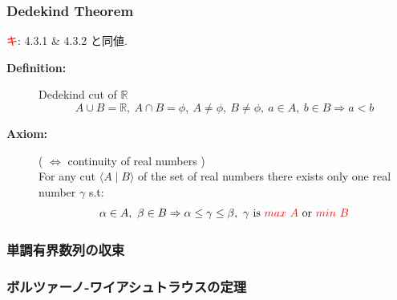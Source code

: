\documentclass[english,dvipdfmx]{jsarticle}
\newcommand{\average}[1]{\ensuremath{\langle#1\rangle} }
\newcommand*{\point}{\textcircled{\textcolor{red}{\scriptsize キ}}}
\begin{document}
    \subsubsection{Dedekind Theorem}
    \point : 4.3.1 \& 4.3.2 と同値.
    \begin{description}
        \item[\bf{Definition:}] Dedekind cut of $\mathbb{R}$
            \begin{equation*}
                A \cup B = \mathbb{R},\ A \cap B = \phi,\ A \neq \phi,\ B \neq \phi,\ a \in A,\ b \in B \Rightarrow a < b
            \end{equation*}
        \item[\bf{Axiom:}] {\color{cyan}{Dedekind theorem}} ( $\Leftrightarrow$ continuity of real numbers ) \\
            For any cut $\average{A \mid B}$ of the set of real numbers there exists only one real number $\gamma$ s.t:
            \begin{equation*}
                \alpha \in A ,\ \beta \in B \Rightarrow \alpha \leq \gamma \leq \beta ,\ \gamma \text{ is } {\color{red}{max \ A}} \text{ or } {\color{red}{min \ B}}
            \end{equation*}
    \end{description}
    \subsubsection{単調有界数列の収束}
    \subsubsection{ボルツァーノ-ワイアシュトラウスの定理}

\newpage
\end{document}
